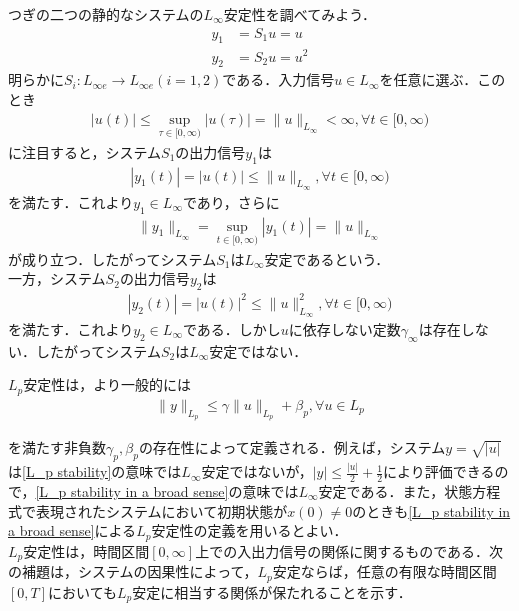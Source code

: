 \documentclass[a4paper,11pt,uplatex]{jsarticle} %
\theoremstyle{definition}	%
\begin{document}
\begin{tcolorbox}[title=例5.5,
drop small lifted shadow=black]
つぎの二つの静的なシステムの$L_\infty$安定性を調べてみよう．
\begin{align*}
y_1 &= S_1 u = u \\
y_2 &= S_2 u =u^2
\end{align*}
明らかに$S_i : L_{\infty e} \to L_{\infty e } (i= 1,2)$である．入力信号$u \in L_\infty $を任意に選ぶ．このとき
\begin{align}
\label{eq1:example 5.5}
| u(t) | \leq \sup_{\tau \in [0, \infty) } | u(\tau ) | = \| u \|_{L_\infty} < \infty, \forall t \in [0, \infty)
\end{align}
に注目すると，システム$S_1$の出力信号$y_1$は
\begin{align}
\label{eq2:example 5.5}
| y_1 (t) | = | u(t) | \leq \| u \|_{L_\infty}, \forall t \in [0, \infty)
\end{align}
を満たす．これより$y_1 \in L_\infty $であり，さらに
\begin{align}
\label{eq3: example 5.5}
\| y_1 \|_{L_\infty} = \sup_{t \in [0, \infty)} | y_1 (t) | = \| u \|_{L_\infty}
\end{align}
が成り立つ．したがってシステム$S_1$は$L_\infty$安定であるという．\\
一方，システム$S_2$の出力信号$y_2$は
\begin{align}
\label{eq4: example 5.5}
| y_2 (t) | = | u(t) |^2 \leq \| u \|^2_{L_\infty}, \forall t \in [0, \infty)
\end{align}
を満たす．これより$y_2 \in L_\infty $である．しかし$u$に依存しない定数$\gamma_\infty$は存在しない．したがってシステム$S_2$は$L_\infty$安定ではない．
\end{tcolorbox}



$L_p$安定性は，より一般的には
\begin{align}
\label{L_p stability in a broad sense}
\| y \|_{L_p} \leq \gamma \| u \|_{L_p} + \beta_p, \forall u \in L_p
\end{align}

を満たす非負数$\gamma_p, \beta_p$の存在性によって定義される．例えば，システム$y = \sqrt{| u |}$は\eqref{L_p stability}の意味では$L_\infty$安定ではないが，$|y| \leq \frac{|u|}{2} + \frac{1}{2}$により評価できるので，\eqref{L_p stability in a broad sense}の意味では$L_\infty$安定である．また，状態方程式で表現されたシステムにおいて初期状態が$x(0) \neq 0$のときも\eqref{L_p stability in a broad sense}による$L_p$安定性の定義を用いるとよい．\\
$L_p$安定性は，時間区間$[0, \infty]$上での入出力信号の関係に関するものである．次の補題は，システムの因果性によって，$L_p$安定ならば，任意の有限な時間区間$[0,T]$においても$L_p$安定に相当する関係が保たれることを示す．
\end{document}
